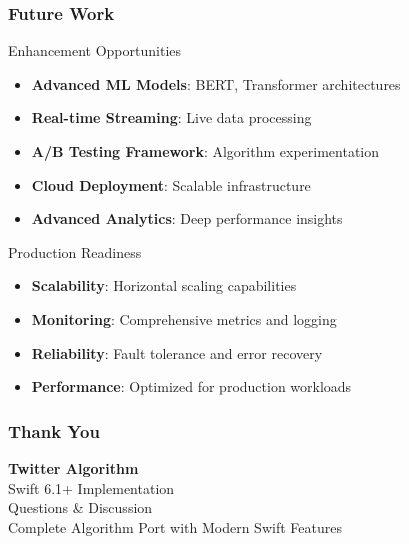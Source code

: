 \documentclass[aspectratio=169]{beamer}
\begin{document}
\begin{frame}
    \frametitle{Future Work}
    \begin{block}{Enhancement Opportunities}
        \begin{itemize}
            \item \textbf{Advanced ML Models}: BERT, Transformer architectures
            \item \textbf{Real-time Streaming}: Live data processing
            \item \textbf{A/B Testing Framework}: Algorithm experimentation
            \item \textbf{Cloud Deployment}: Scalable infrastructure
            \item \textbf{Advanced Analytics}: Deep performance insights
        \end{itemize}
    \end{block}
    
    \begin{block}{Production Readiness}
        \begin{itemize}
            \item \textbf{Scalability}: Horizontal scaling capabilities
            \item \textbf{Monitoring}: Comprehensive metrics and logging
            \item \textbf{Reliability}: Fault tolerance and error recovery
            \item \textbf{Performance}: Optimized for production workloads
        \end{itemize}
    \end{block}
\end{frame}

\begin{frame}
    \frametitle{Thank You}
    \begin{center}
        {\Large\color{twitterblue}\textbf{Twitter Algorithm}}\\[0.5cm]
        {\large\color{swiftorange}Swift 6.1+ Implementation}\\[1cm]
        {\large Questions \& Discussion}\\[0.5cm]
        {\large Complete Algorithm Port with Modern Swift Features}
    \end{center}
\end{frame}
\end{document}
